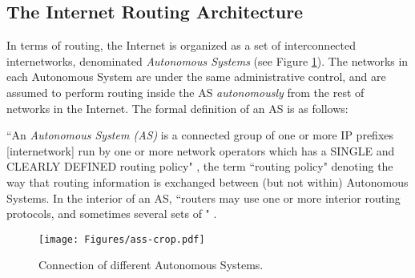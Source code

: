 



\subsection{The Internet Routing Architecture}
\label{ss:irarq}

In terms of routing, the Internet is organized as a set of interconnected internetworks, denominated {\em Autonomous Systems} (see Figure \ref{f:ass}). The networks in each Autonomous System are under the same administrative control, and are assumed to perform routing inside the AS {\em autonomously} from the rest of networks in the Internet. The formal definition of an AS is as follows:

\begin{definition}
``An \emph{Autonomous System (AS)} is a connected group of one or more IP prefixes [internetwork] run by one or more network operators which has a SINGLE and CLEARLY DEFINED routing policy" \cite{rfc1930}, the term ``routing policy" denoting the way that routing information is exchanged between (but not within) Autonomous Systems. In the interior of an AS, ``routers may use one or more interior routing protocols, and sometimes several sets of " \cite{rfc1812}.
\end{definition}

\begin{figure}[htb]	%
\centering
\texttt{[image: Figures/ass-crop.pdf]} %
\caption{Connection of different Autonomous Systems.}
\label{f:ass}
\end{figure}

